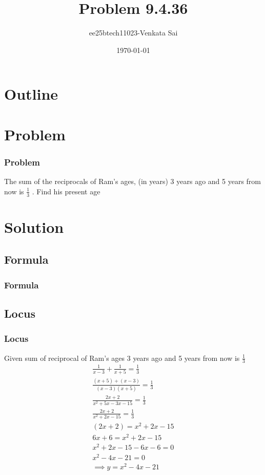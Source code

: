 \documentclass{beamer}
\title{Problem 9.4.36}
\author{ee25btech11023-Venkata Sai}
\date{\today}
\providecommand{\brak}[1]{\ensuremath{\left(#1\right)}}
\theoremstyle{remark}
\numberwithin{equation}{section}
\begin{document}
\begin{frame}
\titlepage
\end{frame}

\section*{Outline}
\begin{frame}
\tableofcontents
\end{frame}

\section{Problem}

\begin{frame}
\frametitle{Problem}
The sum of the reciprocals of Ram's ages, (in years) 3 years ago and 5 years from
now is $\frac{1}{3}$ . Find his present age
\end{frame}
\section{Solution}

\subsection{Formula}
\setcounter{section}{1}
\begin{frame}
\frametitle{Formula}
 
\end{frame}
\subsection{Locus}
\begin{frame}
\frametitle{Locus}
Given sum of reciprocal of Ram's ages 3 years ago and 5 years from
now is $\frac{1}{3}$
\begin{align}
\frac{1}{x-3}+\frac{1}{x+5}=\frac{1}{3} \\
\frac{\brak{x+5}+\brak{x-3}}{\brak{x-3}\brak{x+5}}=\frac{1}{3} \\
\frac{2x+2}{x^2+5x-3x-15}=\frac{1}{3}\\
\frac{2x+2}{x^2+2x-15}=\frac{1}{3}\\
\brak{2x+2}=x^2+2x-15\\
6x+6=x^2+2x-15 \\
x^2+2x-15-6x-6=0 \\
x^2-4x-21=0 \\
\implies y=x^2-4x-21
  \end{align}
\end{frame}
\end{document}
